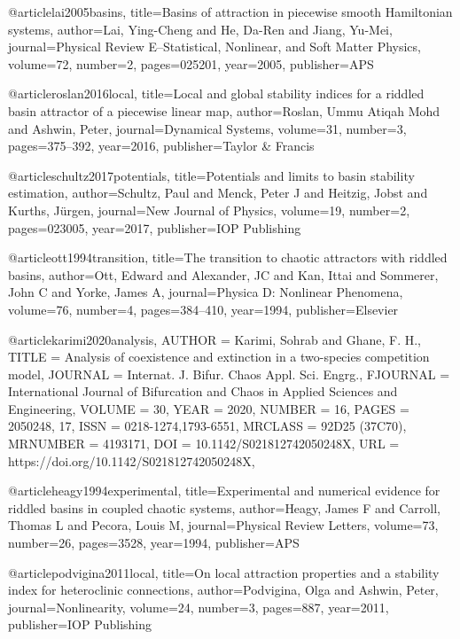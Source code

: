 @article{lai2005basins,
  title={Basins of attraction in piecewise smooth Hamiltonian systems},
  author={Lai, Ying-Cheng and He, Da-Ren and Jiang, Yu-Mei},
  journal={Physical Review E--Statistical, Nonlinear, and Soft Matter Physics},
  volume={72},
  number={2},
  pages={025201},
  year={2005},
  publisher={APS}
}

@article{roslan2016local,
  title={Local and global stability indices for a riddled basin attractor of a piecewise linear map},
  author={Roslan, Ummu Atiqah Mohd and Ashwin, Peter},
  journal={Dynamical Systems},
  volume={31},
  number={3},
  pages={375--392},
  year={2016},
  publisher={Taylor \& Francis}
}

@article{schultz2017potentials,
  title={Potentials and limits to basin stability estimation},
  author={Schultz, Paul and Menck, Peter J and Heitzig, Jobst and Kurths, J{\"u}rgen},
  journal={New Journal of Physics},
  volume={19},
  number={2},
  pages={023005},
  year={2017},
  publisher={IOP Publishing}
}


@article{ott1994transition,
  title={The transition to chaotic attractors with riddled basins},
  author={Ott, Edward and Alexander, JC and Kan, Ittai and Sommerer, John C and Yorke, James A},
  journal={Physica D: Nonlinear Phenomena},
  volume={76},
  number={4},
  pages={384--410},
  year={1994},
  publisher={Elsevier}
}




@article{karimi2020analysis,
    AUTHOR = {Karimi, Sohrab and Ghane, F. H.},
     TITLE = {Analysis of coexistence and extinction in a two-species
              competition model},
   JOURNAL = {Internat. J. Bifur. Chaos Appl. Sci. Engrg.},
  FJOURNAL = {International Journal of Bifurcation and Chaos in Applied
              Sciences and Engineering},
    VOLUME = {30},
      YEAR = {2020},
    NUMBER = {16},
     PAGES = {2050248, 17},
      ISSN = {0218-1274,1793-6551},
   MRCLASS = {92D25 (37C70)},
  MRNUMBER = {4193171},
       DOI = {10.1142/S021812742050248X},
       URL = {https://doi.org/10.1142/S021812742050248X},
}




@article{heagy1994experimental,
  title={Experimental and numerical evidence for riddled basins in coupled chaotic systems},
  author={Heagy, James F and Carroll, Thomas L and Pecora, Louis M},
  journal={Physical Review Letters},
  volume={73},
  number={26},
  pages={3528},
  year={1994},
  publisher={APS}
}

@article{podvigina2011local,
  title={On local attraction properties and a stability index for heteroclinic connections},
  author={Podvigina, Olga and Ashwin, Peter},
  journal={Nonlinearity},
  volume={24},
  number={3},
  pages={887},
  year={2011},
  publisher={IOP Publishing}
}






